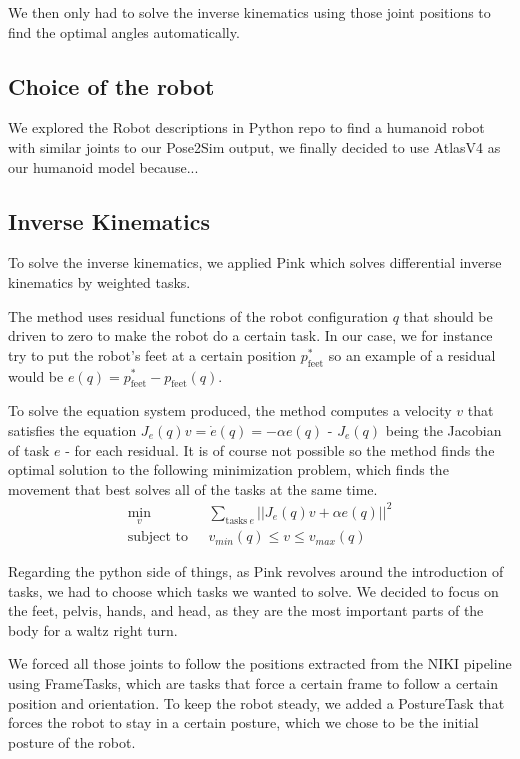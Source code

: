 \documentclass{amsart}
\theoremstyle{definition}
\theoremstyle{plain}
\begin{document}
We then only had to solve the inverse kinematics using those joint positions to find the optimal angles automatically.

\subsection{Choice of the robot}


We explored the Robot descriptions in Python repo\cite{robot_descriptions_py} to find a humanoid robot with similar joints to our Pose2Sim output, we finally decided to use AtlasV4 as our humanoid model because...

\subsection{Inverse Kinematics}
To solve the inverse kinematics, we applied Pink\cite{pink2024} which solves differential inverse kinematics by weighted tasks. 

The method uses residual functions of the robot configuration $q$ that should be driven to zero to make the robot do a certain task. In our case, we for instance try to put the robot's feet at a certain position $p_{\text{feet}}^*$ so an example of a residual would be $e(q) = p_{\text{feet}}^* - p_{\text{feet}}(q)$. 

To solve the equation system produced, the method computes a velocity $v$ that satisfies the equation $J_e(q)v = \dot{e}(q) = -\alpha e(q)$ - $J_e(q)$ being the Jacobian of task $e$ - for each residual. 
It is of course not possible so the method finds the optimal solution to the following minimization problem, which finds the movement that best solves all of the tasks at the same time.
$$
\begin{aligned}
\min_v \ \ &\sum_{\text{tasks} \ e} ||J_e(q)v + \alpha e(q)||^2 \\
\text{subject to} \ \ \ &v_{min}(q) \leq v \leq v_{max}(q)
\end{aligned}
$$

Regarding the python side of things, as Pink revolves around the introduction of tasks, we had to choose which tasks we wanted to solve. We decided to focus on the feet, pelvis, hands, and head, as they are the most important parts of the body for a waltz right turn. 

We forced all those joints to follow the positions extracted from the NIKI pipeline using FrameTasks, which are tasks that force a certain frame to follow a certain position and orientation. To keep the robot steady, we added a PostureTask that forces the robot to stay in a certain posture, which we chose to be the initial posture of the robot.
\end{document}
